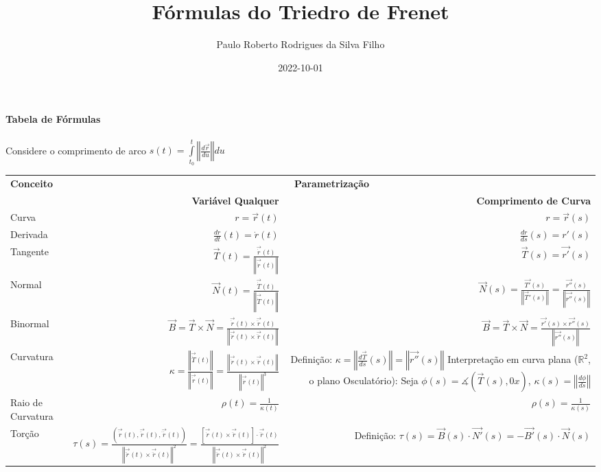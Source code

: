 \documentclass{article}
\title{Fórmulas do Triedro de Frenet}
\date{2022-10-01}
\author{Paulo Roberto Rodrigues da Silva Filho}
\newcommand\N[1]{\left\Vert#1\right\Vert}
\begin{document}
	\maketitle
	\paragraph{Tabela de Fórmulas}
	Considere o comprimento de arco $ s(t) = \int\limits_{t_0}^{t} \N{\frac{d\vec{r}}{du}}du$
	\begin{center}
		\begin{tabular}{ l | r | r  }
			\hhline{===}
			\textbf{Conceito} & 
			\multicolumn{2}{c}{\textbf{Parametrização}} \\
			{ } & \textbf{Variável Qualquer} & \textbf{Comprimento de Curva} \\
			\hhline{===}
			Curva & 
			$r = \vec{r}(t)$ & 
			$r = \vec{r}(s)$ \\  
			\hline
			Derivada & 
			$ \frac{dr}{dt}(t) = \dot r(t) $
			& $ \frac{dr}{ds}(s) = r'(s) $ \\  
			\hline
			Tangente &
			$ \vec{T}(t) = \frac{\vec{\dot r}(t)}{\N{\vec{\dot r}(t)}} $ & 
			$ \vec{T}(s) = \vec{r'}(s) $ \\  
			\hline
			Normal & $ \vec{N}(t) = \frac{\vec{\dot T}(t)}{\N{\vec{\dot T}(t)}} $ & 
			$ \vec{N}(s) = \frac{\vec{T'}(s)}{\N{\vec{T}'(s)}} = \frac{\vec{r''}(s)}{\N{ \vec{r''}(s) }}$ \\  
			\hline
			Binormal & 
			$ \vec{B} = \vec{T} \times \vec{N} = \frac{\vec{\dot r}(t) \times \vec{\ddot r}(t)}{\N{ \vec{\dot r}(t) \times \vec{\ddot r}(t) }}$ & 
			$ \vec{B} = \vec{T} \times \vec{N} = \frac{\vec{r'}(s) \times \vec{r''}(s) }{\N{ \vec{r''}(s) }}$ \\  
			\hline
			Curvatura & 
			$ \kappa = \frac{\N{ \vec{\dot T}(t) }}{ \N{ \vec{\dot r}(t) }} = \frac{\N{ \vec{\dot r}(t) \times \vec{\ddot r}(t) }}{\N{ \vec{\dot r}(t)}^3} $ & 
			\makecell[r]{Definição: \\ $ \kappa = \N{ \frac{d \vec{T}}{ds}(s) } = \N{ \vec{r''}(s) }$ \\ Interpretação em curva plana \\ 
			($\mathbb{R}^2$, o plano Osculatório): \\ Seja $ \phi(s) = \measuredangle(\vec{T}(s), 0x) $, $ \kappa(s) = \N{\frac{d\phi}{ds}} $  } \\  
			\hline
			Raio de Curvatura & $ \rho (t) = \frac{1}{\kappa (t)} $ & $ \rho (s) = \frac{1}{\kappa(s)} $ \\  
			\hline
			Torção & $ \tau(s) = \frac{(\vec{\dot{r}}(t), \vec{\ddot{r}}(t), \vec{\dddot{r}}(t))}{\N{\vec{\ddot{r}}(t) \times \vec{\ddot{r}}(t)}^2} = \frac{[\vec{\dot{r}}(t) \times \vec{\ddot{r}}(t)] \cdot \vec{\dddot{r}}(t)}{\N{\vec{\ddot{r}}(t) \times \vec{\ddot{r}}(t)}^2} $ & \makecell[r]{Definição: \\ $ \tau(s) = \vec{B}(s) \cdot \vec{N'}(s) = - \vec{B'}(s) \cdot \vec{N}(s) $} \\  

\end{tabular}
\end{center}
\end{document}
